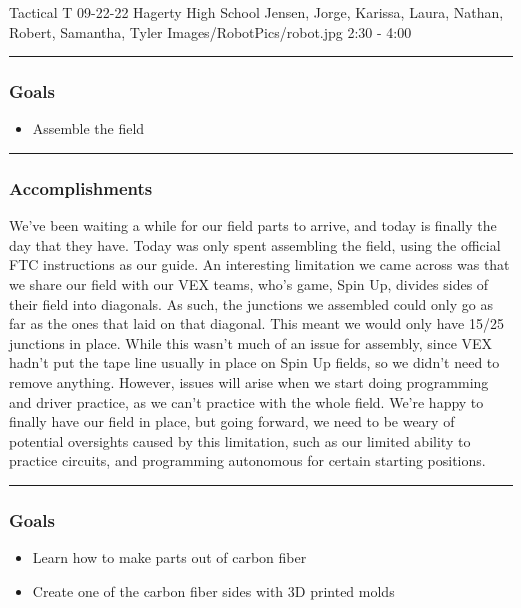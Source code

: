\insertmeeting 
	{Tactical T} 
	{09-22-22}
	{Hagerty High School}
	{Jensen, Jorge, Karissa, Laura, Nathan, Robert, Samantha, Tyler}
	{Images/RobotPics/robot.jpg}
	{2:30 - 4:00}
	
\noindent\hfil\rule{\textwidth}{.4pt}\hfil
\subsubsection*{Goals}
\begin{itemize}
    \item Assemble the field

\end{itemize} 

\noindent\hfil\rule{\textwidth}{.4pt}\hfil

\subsubsection*{Accomplishments}
We've been waiting a while for our field parts to arrive, and today is finally the day that they have. Today was only spent assembling the field, using the official FTC instructions as our guide. An interesting limitation we came across was that we share our field with our VEX teams, who's game, Spin Up, divides sides of their field into diagonals. As such, the junctions we assembled could only go as far as the ones that laid on that diagonal. This meant we would only have 15/25 junctions in place. While this wasn't much of an issue for assembly, since VEX hadn't put the tape line usually in place on Spin Up fields, so we didn't need to remove anything. However, issues will arise when we start doing programming and driver practice, as we can't practice with the whole field. We're happy to finally have our field in place, but going forward, we need to be weary of potential oversights caused by this limitation, such as our limited ability to practice circuits, and programming autonomous for certain starting positions.

\noindent\hfil\rule{\textwidth}{.4pt}\hfil
\subsubsection*{Goals}
\begin{itemize}
    \item Learn how to make parts out of carbon fiber
	\item Create one of the carbon fiber sides with 3D printed molds

\end{itemize} 

